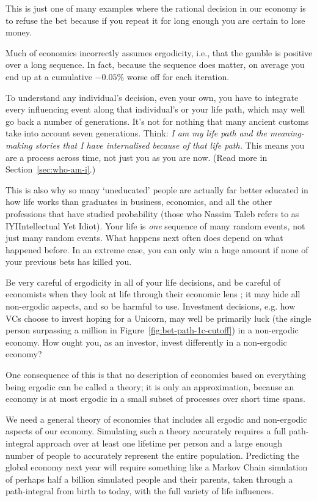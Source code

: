 This is just one of many examples where the rational decision in our economy is to refuse the bet because if you repeat it for long enough you are certain to lose money.


Much of economics incorrectly assumes ergodicity, i.e., that the gamble is positive over a long sequence. In fact, because the sequence does matter, on average you end up at a cumulative $-0.05\%$ worse off for each iteration.


To understand any individual's decision, even your own, you have to integrate every influencing event along that individual’s or your life path, which may well go back a number of generations. It's not for nothing that many ancient customs take into account seven generations. Think: \emph{I am my life path and the meaning-making stories that I have internalised because of that life path.} This means you are a process across time, not just you as you are now. (Read more in Section~\ref{sec:who-am-i}.)


This is also why so many ‘uneducated’ people are actually far better educated in how life works than graduates in business, economics, and all the other professions that have studied probability (those who Nassim Taleb\cite{taleb-skin}  refers to as IYI\textemdash Intellectual Yet Idiot). Your life is \emph{one} sequence of many random events, not just many random events. What happens next often does depend on what happened before. In an extreme case, you can only win a huge amount if none of your previous bets has killed you. 


Be very careful of ergodicity in all of your life decisions, and be careful of economists when they look at life through their economic lens ; it may hide all non-ergodic aspects, and so be harmful to use. Investment decisions, e.g. how VCs choose to invest hoping for a Unicorn, may well be primarily luck (the single person surpassing a million in Figure~\ref{fig:bet-path-1c-cutoff}) in a non-ergodic economy. How ought you, as an investor, invest differently in a non-ergodic economy?


One consequence of this is that no description of economies based on everything being ergodic can be called a theory; it is only an approximation, because an economy is at most ergodic in a small subset of processes over short time spans.


We need a general theory of economies  that includes all ergodic and non-ergodic aspects of our economy. Simulating such a theory accurately requires a full path\hyp{}integral approach over at least one lifetime per person and a large enough number of people to accurately represent the entire population. Predicting the global economy next year will require something like a Markov Chain simulation of perhaps half a billion simulated people and their parents, taken through a path-integral from birth to today, with the full variety of life influences. 
